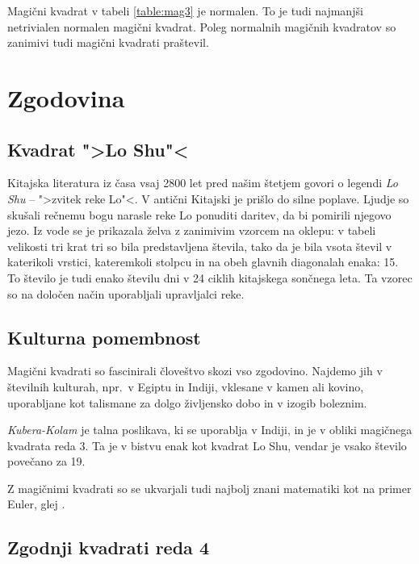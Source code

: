 \documentclass[a4paper,12pt]{article}
\theoremstyle{definition}
\begin{document}
Magični kvadrat v tabeli \ref{table:mag3} je normalen.
To je tudi najmanjši netrivialen normalen magični kvadrat.
Poleg normalnih magičnih kvadratov so zanimivi tudi magični kvadrati praštevil. %


\section{Zgodovina}

\subsection{Kvadrat ">Lo Shu"<}

Kitajska literatura iz časa vsaj 2800 let pred našim štetjem govori o legendi
\emph{Lo Shu} -- ">zvitek reke Lo"<. V antični Kitajski je prišlo do
silne poplave. Ljudje so skušali rečnemu bogu narasle reke Lo ponuditi daritev,
da bi pomirili njegovo jezo. Iz vode se je prikazala želva z zanimivim vzorcem
na oklepu: v tabeli velikosti tri krat tri so bila predstavljena števila, tako
da je bila vsota števil v katerikoli vrstici, kateremkoli stolpcu in na obeh
glavnih diagonalah enaka: 15. To število je tudi enako številu dni v 24 ciklih
kitajskega sončnega leta. Ta vzorec so na določen način uporabljali upravljalci
reke.


\subsection{Kulturna pomembnost}

Magični kvadrati so fascinirali človeštvo skozi vso zgodovino. Najdemo jih
v številnih kulturah, npr.\ v Egiptu in Indiji, vklesane v kamen ali
kovino, uporabljane kot talismane za dolgo življensko dobo in v
izogib boleznim.

\emph{Kubera-Kolam} je talna poslikava, ki se uporablja v Indiji, in je v
obliki magičnega kvadrata reda 3. Ta je v bistvu enak kot kvadrat
Lo Shu, vendar je vsako število povečano za 19.

Z magičnimi kvadrati so se ukvarjali tudi najbolj znani matematiki kot na
primer Euler, glej \cite{euler}.


\subsection{Zgodnji kvadrati reda 4}
\end{document}
